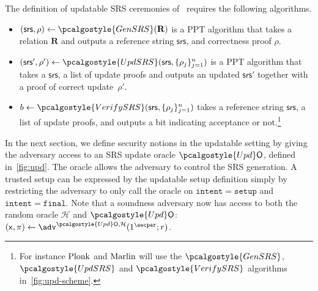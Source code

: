 \documentclass[10pt]{llncs}
\renewcommand{\kgen}{\pcalgostyle{GenSRS}}
\newcommand{\upd}{\pcalgostyle{UpdSRS}}
\newcommand{\verifyCRS}{\pcalgostyle{VerifySRS}}
\newcommand{\initU}{\pcalgostyle{Upd}\oracleo}
\newcommand{\pcvarstyle}[1]{\mathsf{#1}}
\newcommand{\msg}[1]{\mathtt{#1}}
\newcommand{\oracleo}{\mathsf{O}}
\newcommand{\intent}{\msg{intent}}
\newcommand{\setup}{\msg{setup}}
\newcommand{\final}{\msg{final}}
\newcommand{\srs}{\pcvarstyle{srs}}
\newcommand{\zkproof}{\pi}
\newcommand{\ro}{\mathcal{H}}
\newcommand{\REL}{\mathbf{R}}
\newcommand{\inp}{\pcvarstyle{x}}
\newcommand{\plonk}{\ensuremath{\textnormal{{Plonk}}}}
\newcommand{\marlin}{{\ensuremath{\textnormal{{Marlin}}}}}
\begin{document}
The definition of updatable SRS ceremonies of~\cite{C:GKMMM18} requires the following algorithms.

\begin{itemize} 
	\item
	$(\srs,\rho) \gets \kgen(\REL)$ is a PPT algorithm that takes a relation $\REL$ and outputs a reference string $\srs$, and correctness proof $\rho$.
	\item
	$ (\srs',\rho') \gets \upd(\srs, \{\rho_j \}_{j=1}^n)$ is a PPT algorithm that takes a $\srs$, a list of update proofs and outputs an updated $\srs'$ together with a proof of correct update~$\rho'$. 
	\item
	$b \gets \verifyCRS(\srs, \{\rho_j \}_{j=1}^n)$ takes a reference string $\srs$, a list of update proofs, and outputs a bit indicating acceptance or not.\footnote{For instance \plonk{} and \marlin{} will use the $\kgen$, $\upd$ and $\verifyCRS$ algorithms in~\cref{fig:upd-scheme}.}
\end{itemize}


In the next section, we define security notions in the updatable setting by giving the adversary access to an SRS update oracle $\initU$, defined in~\cref{fig:upd}. The oracle allows the adversary to control the SRS generation. A trusted setup can be expressed by the updatable setup definition simply by restricting the adversary to only call the oracle on $\intent = \setup$ and $\intent = \final$. Note that a soundness adversary now has access to both the random oracle $\ro$ and $\initU$:  $(\inp, \zkproof) \gets \adv^{\initU,\ro}(1^\secpar; r)$.

\newcommand*{\Scale}[2][4]{\scalebox{#1}{$#2$}}%
\end{document}

